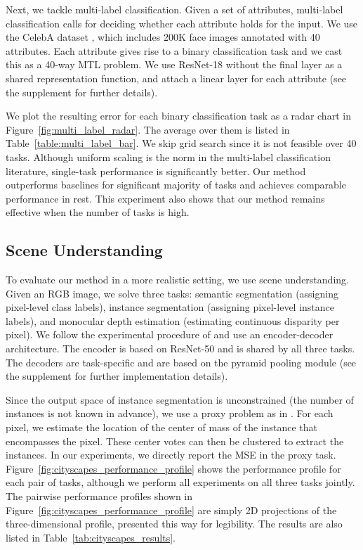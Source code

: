 \documentclass{article}
\begin{document}
Next, we tackle multi-label classification. Given a set of attributes, multi-label classification calls for deciding whether each attribute holds for the input. We use the CelebA dataset \citep{celeba}, which includes 200K face images annotated with 40 attributes. Each attribute gives rise to a binary classification task and we cast this as a 40-way MTL problem. We use ResNet-18 \citep{resnet} without the final layer as a shared representation function, and attach a linear layer for each attribute (see the supplement for further details).


We plot the resulting error for each binary classification task as a radar chart in Figure~\ref{fig:multi_label_radar}. The average over them is listed in Table~\ref{table:multi_label_bar}. We skip grid search since it is not feasible over 40 tasks. Although uniform scaling is the norm in the multi-label classification literature, single-task performance is significantly better. Our method outperforms baselines for significant majority of tasks and achieves comparable performance in rest. This experiment also shows that our method remains effective when the number of tasks is high.


\subsection{Scene Understanding}

To evaluate our method in a more realistic setting, we use scene understanding. Given an RGB image, we solve three tasks: semantic segmentation (assigning pixel-level class labels), instance segmentation (assigning pixel-level instance labels), and monocular depth estimation (estimating continuous disparity per pixel). We follow the experimental procedure of \citet{Kendall2018} and use an encoder-decoder architecture. The encoder is based on ResNet-50 \citep{resnet} and is shared by all three tasks. The decoders are task-specific and are based on the pyramid pooling module \citep{pspnet} (see the supplement for further implementation details).

Since the output space of instance segmentation is unconstrained (the number of instances is not known in advance), we use a proxy problem as in \citet{Kendall2018}. For each pixel, we estimate the location of the center of mass of the instance that encompasses the pixel. These center votes can then be clustered to extract the instances. In our experiments, we directly report the MSE in the proxy task. Figure~\ref{fig:cityscapes_performance_profile} shows the performance profile for each pair of tasks, although we perform all experiments on all three tasks jointly. The pairwise performance profiles shown in Figure~\ref{fig:cityscapes_performance_profile} are simply 2D projections of the three-dimensional profile, presented this way for legibility. The results are also listed in Table~\ref{tab:cityscapes_results}.
\end{document}
